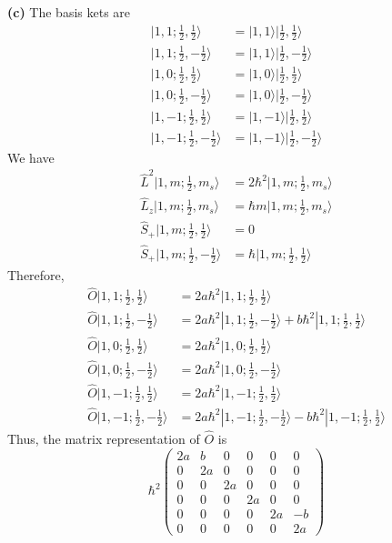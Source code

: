 \documentclass{article}
\begin{document}
\textbf{(c)} 
The basis kets are
\begin{align*}
|1, 1; \frac{1}{2}, \frac{1}{2}\rangle &= |1, 1\rangle |\frac{1}{2}, \frac{1}{2}\rangle \\
|1, 1; \frac{1}{2}, -\frac{1}{2}\rangle &= |1, 1\rangle |\frac{1}{2}, -\frac{1}{2}\rangle \\
|1, 0; \frac{1}{2}, \frac{1}{2}\rangle &= |1, 0\rangle |\frac{1}{2}, \frac{1}{2}\rangle \\
|1, 0; \frac{1}{2}, -\frac{1}{2}\rangle &= |1, 0\rangle |\frac{1}{2}, -\frac{1}{2}\rangle \\
|1, -1; \frac{1}{2}, \frac{1}{2}\rangle &= |1, -1\rangle |\frac{1}{2}, \frac{1}{2}\rangle \\
|1, -1; \frac{1}{2}, -\frac{1}{2}\rangle &= |1, -1\rangle |\frac{1}{2}, -\frac{1}{2}\rangle
\end{align*}
We have
\begin{align*}
\hat{L}^2 |1, m; \frac{1}{2}, m_s\rangle &= 2\hbar^2 |1, m; \frac{1}{2}, m_s\rangle \\
\hat{L}_z |1, m; \frac{1}{2}, m_s\rangle &= \hbar m |1, m; \frac{1}{2}, m_s\rangle \\
\hat{S}_+ |1, m; \frac{1}{2}, \frac{1}{2}\rangle &= 0 \\
\hat{S}_+ |1, m; \frac{1}{2}, -\frac{1}{2}\rangle &= \hbar |1, m; \frac{1}{2}, \frac{1}{2}\rangle
\end{align*}
Therefore,
\begin{align*}
\hat{O} |1, 1; \frac{1}{2}, \frac{1}{2}\rangle &= 2a\hbar^2 |1, 1; \frac{1}{2}, \frac{1}{2}\rangle \\
\hat{O} |1, 1; \frac{1}{2}, -\frac{1}{2}\rangle &= 2a\hbar^2 |1, 1; \frac{1}{2}, -\frac{1}{2}\rangle + b\hbar^2 |1, 1; \frac{1}{2}, \frac{1}{2}\rangle \\
\hat{O} |1, 0; \frac{1}{2}, \frac{1}{2}\rangle &= 2a\hbar^2 |1, 0; \frac{1}{2}, \frac{1}{2}\rangle \\
\hat{O} |1, 0; \frac{1}{2}, -\frac{1}{2}\rangle &= 2a\hbar^2 |1, 0; \frac{1}{2}, -\frac{1}{2}\rangle \\
\hat{O} |1, -1; \frac{1}{2}, \frac{1}{2}\rangle &= 2a\hbar^2 |1, -1; \frac{1}{2}, \frac{1}{2}\rangle \\
\hat{O} |1, -1; \frac{1}{2}, -\frac{1}{2}\rangle &= 2a\hbar^2 |1, -1; \frac{1}{2}, -\frac{1}{2}\rangle - b\hbar^2 |1, -1; \frac{1}{2}, \frac{1}{2}\rangle
\end{align*}
Thus, the matrix representation of $\hat{O}$ is
\[
\hbar^2 \begin{pmatrix}
2a & b & 0 & 0 & 0 & 0 \\
0 & 2a & 0 & 0 & 0 & 0 \\
0 & 0 & 2a & 0 & 0 & 0 \\
0 & 0 & 0 & 2a & 0 & 0 \\
0 & 0 & 0 & 0 & 2a & -b \\
0 & 0 & 0 & 0 & 0 & 2a
\end{pmatrix}
\]
\end{document}
